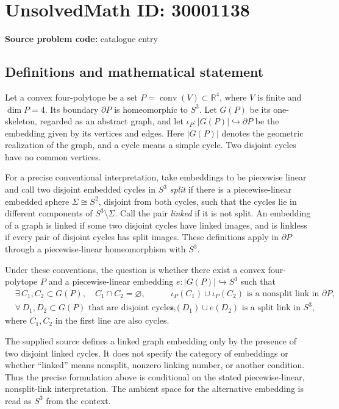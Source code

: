 \documentclass[11pt]{article}
\newcommand{\R}{\mathbb{R}}
\begin{document}
\section*{UnsolvedMath ID: 30001138}
\textbf{Source problem code:} catalogue entry
\subsection{Definitions and mathematical statement}
Let a convex four-polytope be a set \(P=\operatorname{conv}(V)\subset\R^4\), where \(V\) is finite and \(\dim P=4\). Its boundary \(\partial P\) is homeomorphic to \(S^3\). Let \(G(P)\) be its one-skeleton, regarded as an abstract graph, and let \(\iota_P:|G(P)|\hookrightarrow\partial P\) be the embedding given by its vertices and edges. Here \(|G(P)|\) denotes the geometric realization of the graph, and a cycle means a simple cycle. Two disjoint cycles have no common vertices.

For a precise conventional interpretation, take embeddings to be piecewise linear and call two disjoint embedded cycles in \(S^3\) \emph{split} if there is a piecewise-linear embedded sphere \(\Sigma\cong S^2\), disjoint from both cycles, such that the cycles lie in different components of \(S^3\setminus\Sigma\). Call the pair \emph{linked} if it is not split. An embedding of a graph is linked if some two disjoint cycles have linked images, and is linkless if every pair of disjoint cycles has split images. These definitions apply in \(\partial P\) through a piecewise-linear homeomorphism with \(S^3\).

Under these conventions, the question is whether there exist a convex four-polytope \(P\) and a piecewise-linear embedding \(e:|G(P)|\hookrightarrow S^3\) such that
\[
\begin{aligned}
&\exists\, C_1,C_2\subset G(P),\quad C_1\cap C_2=\varnothing,
&&\iota_P(C_1)\cup\iota_P(C_2)\text{ is a nonsplit link in }\partial P,\\
&\forall\, D_1,D_2\subset G(P)\text{ that are disjoint cycles},
&&e(D_1)\cup e(D_2)\text{ is a split link in }S^3,
\end{aligned}
\]
where \(C_1,C_2\) in the first line are also cycles.

The supplied source defines a linked graph embedding only by the presence of two disjoint linked cycles. It does not specify the category of embeddings or whether ``linked'' means nonsplit, nonzero linking number, or another condition. Thus the precise formulation above is conditional on the stated piecewise-linear, nonsplit-link interpretation. The ambient space for the alternative embedding is read as \(S^3\) from the context.
\end{document}
